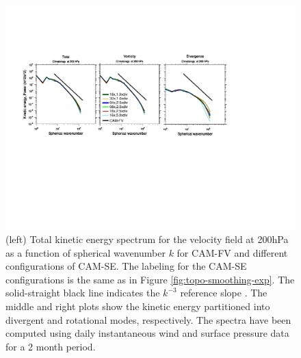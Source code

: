 \documentclass[gmd]{copernicus}
\begin{document}
\begin{figure}[t]
\vspace*{2mm}
\begin{center}
\includegraphics[width=12cm]{fig/TKE-fig}
\end{center}
  \caption{(left) Total kinetic energy spectrum for the velocity field at 200hPa as a function of spherical wavenumber $k$ for CAM-FV and different configurations of CAM-SE. The labeling for the CAM-SE configurations is the same as in Figure \ref{fig:topo-smoothing-exp}. The solid-straight black line indicates the $k^{-3}$ reference slope \citep{NG1985JAS}. The middle and right plots show the kinetic energy partitioned into divergent and rotational modes, respectively. The spectra have been computed using daily instantaneous wind and surface pressure data for a 2 month period.}\label{fig:tke}
\end{figure}
\end{document}
